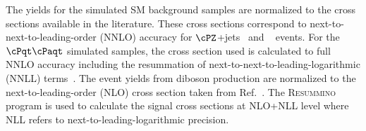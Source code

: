 The yields for the simulated SM background samples are normalized to the cross sections available in the literature.
These cross sections correspond to next-to-next-to-leading-order (NNLO) accuracy for $\cPZ$+jets~\cite{Melnikov:2006kv} 
and \wjets~\cite{xsec_WZ} events. For the $\cPqt\cPaqt$ simulated samples, the cross section used is calculated to full NNLO accuracy including
the resummation of next-to-next-to-leading-logarithmic (NNLL) terms~\cite{Czakon:2011xx}.
The event yields from diboson production are normalized to the next-to-leading-order (NLO) cross section  taken from Ref.~\cite{Campbell:2011bn}. 
The \textsc{Resummino}~\cite{Fuks:2012qx,Fuks:2013vua,Fuks:2013lya} program is used to calculate the signal cross sections at NLO+NLL level where 
NLL refers to next-to-leading-logarithmic precision.
